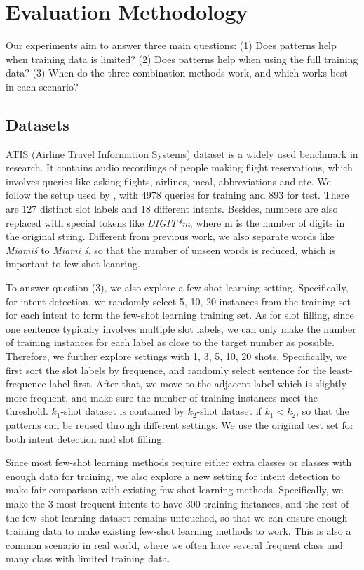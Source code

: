\section{Evaluation Methodology}
Our experiments aim to answer three main questions: (1) Does \RE patterns help when training data is limited? (2) Does \RE patterns help when using the full training data? (3) When do the three combination methods work, and which works best in each scenario?

\subsection{Datasets}
ATIS (Airline Travel Information Systems) dataset \cite{hemphill1990atis} is a widely used benchmark in \NLU research. It contains audio recordings of people making flight reservations, which involves queries like asking flights, airlines, meal, abbreviations and etc. We follow the setup used by \cite{liu2016attention}, with 4978 queries for training and 893 for test. There are 127 distinct slot labels and 18 different intents. Besides, numbers are also replaced with special tokens like \emph{DIGIT*m}, where m is the number of digits in the original string. Different from previous work, we also separate words like \emph{Miami\'s} to \emph{Miami \'s}, so that the number of unseen words is reduced, which is important to few-shot leanring.

To answer question (3), we also explore a few shot learning setting. Specifically, for intent detection, we randomly select 5, 10, 20 instances from the training set for each intent to form the few-shot learning training set. As for slot filling, since one sentence typically involves multiple slot labels, we can only make the number of training instances for each label as close to the target number as possible. Therefore, we further explore settings with 1, 3, 5, 10, 20 shots. Specifically, we first sort the slot labels by frequence, and randomly select sentence for the least-frequence label first. After that, we move to the adjacent label which is slightly more frequent, and make sure the number of training instances meet the threshold. $k_1$-shot dataset is contained by $k_2$-shot dataset if $k_1 < k_2$, so that the \RE patterns can be reused through different settings. We use the original test set for both intent detection and slot filling.

Since most few-shot learning methods require either extra classes or classes with enough data for training, we also explore a new setting for intent detection to make fair comparison with existing few-shot learning methods. Specifically, we make the 3 most frequent intents to have 300 training instances, and the rest of the few-shot learning dataset remains untouched, so that we can ensure enough training data to make existing few-shot learning methods to work. This is also a common scenario in real world, where we often have several frequent class and many class with limited training data.

